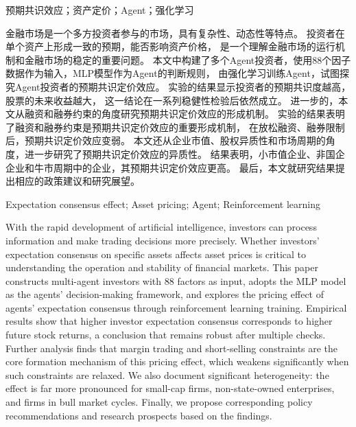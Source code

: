 {}

\begin{cnabstract}{预期共识效应；资产定价；Agent；强化学习}

金融市场是一个多方投资者参与的市场，具有复杂性、动态性等特点。
投资者在单个资产上形成一致的预期，能否影响资产价格，
是一个理解金融市场的运行机制和金融市场的稳定的重要问题。
本文中构建了多个Agent投资者，使用88个因子数据作为输入，MLP模型作为Agent的判断规则，
由强化学习训练Agent，试图探究Agent投资者的预期共识定价效应。
实验的结果显示投资者的预期共识度越高，股票的未来收益越大，
这一结论在一系列稳健性检验后依然成立。
进一步的，本文从融资和融券约束的角度研究预期共识定价效应的形成机制。
实验的结果表明了融资和融券约束是预期共识定价效应的重要形成机制，
在放松融资、融券限制后，预期共识定价效应变弱。
本文还从企业市值、股权异质性和市场周期的角度，进一步研究了预期共识定价效应的异质性。
结果表明，小市值企业、非国企企业和牛市周期中的企业，其预期共识定价效应更高。
最后，本文就研究结果提出相应的政策建议和研究展望。

  
\end{cnabstract}
\newpage

{}

\begin{enabstract}{Expectation consensus effect; Asset pricing; Agent; Reinforcement learning}

With the rapid development of artificial intelligence, investors can process information and make trading decisions more precisely. 
Whether investors' expectation consensus on specific assets affects asset prices 
is critical to understanding the operation and stability of financial markets.
This paper constructs multi-agent investors with 88 factors as input, 
adopts the MLP model as the agents' decision-making framework, 
and explores the pricing effect of agents' expectation consensus through reinforcement learning training.
Empirical results show that higher investor expectation consensus corresponds 
to higher future stock returns, a conclusion that remains robust after multiple checks. 
Further analysis finds that margin trading and short-selling constraints are the core formation mechanism of this pricing effect, 
which weakens significantly when such constraints are relaxed. We also document significant heterogeneity: 
the effect is far more pronounced for small-cap firms, non-state-owned enterprises, and firms in bull market cycles. 
Finally, we propose corresponding policy recommendations and research prospects based on the findings.
\end{enabstract}
\newpage
